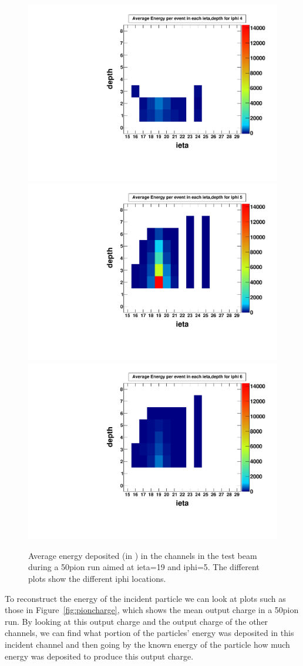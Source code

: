 \begin{figure}
\centering
\includegraphics[width=0.495\linewidth]{Figures/pionrun1.pdf}
\includegraphics[width=0.495\linewidth]{Figures/pionrun.pdf}
\includegraphics[width=0.495\linewidth]{Figures/pionrun2.pdf}
\caption{Average energy deposited (in \MeV) in the channels in the test beam during a 50\GeV\space pion run aimed at ieta=19 and iphi=5. The different plots show the different iphi locations.}
\label{fig:pionmap}
\end{figure}

To reconstruct the energy of the incident particle we can look at plots such as those in Figure~\ref{fig:pioncharge}, which shows the mean output charge in a 50\GeV\space pion run. By looking at this output charge and the output charge of the other channels, we can find what portion of the particles' energy was deposited in this incident channel and then going by the known energy of the particle how much energy was deposited to produce this output charge. 


